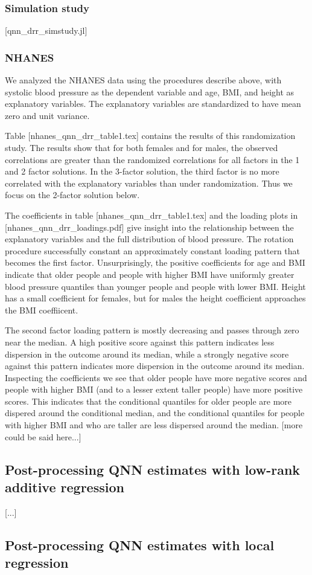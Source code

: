 \subsubsection{Simulation study}

[qnn_drr_simstudy.jl]

\subsubsection{NHANES}

We analyzed the NHANES data using the procedures describe above, with
systolic blood pressure as the dependent variable and age, BMI, and
height as explanatory variables.  The explanatory variables are
standardized to have mean zero and unit variance.

Table [nhanes_qnn_drr_table1.tex] contains the results of this
randomization study.  The results show that for both females and for
males, the observed correlations are greater than the randomized
correlations for all factors in the 1 and 2 factor solutions.  In the
3-factor solution, the third factor is no more correlated with the
explanatory variables than under randomization.  Thus we focus on the
2-factor solution below.

The coefficients in table [nhanes_qnn_drr_table1.tex] and the loading
plots in [nhanes_qnn_drr_loadings.pdf] give insight into the
relationship between the explanatory variables and the full
distribution of blood pressure. The rotation procedure successfully
constant an approximately constant loading pattern that becomes the
first factor.  Unsurprisingly, the positive coefficients for age and
BMI indicate that older people and people with higher BMI have
uniformly greater blood pressure quantiles than younger people and
people with lower BMI. Height has a small coefficient for females, but
for males the height coefficient approaches the BMI coeffiicent.

The second factor loading pattern is mostly decreasing and passes
through zero near the median.  A high positive score against this
pattern indicates less dispersion in the outcome around its median,
while a strongly negative score against this pattern indicates more
dispersion in the outcome around its median.  Inspecting the
coefficients we see that older people have more negative scores and
people with higher BMI (and to a lesser extent taller people) have
more positive scores.  This indicates that the conditional quantiles
for older people are more dispered around the conditional median, and
the conditional quantiles for people with higher BMI and who are
taller are less dispersed around the median.  [more could be said
here...]

\subsection{Post-processing QNN estimates with low-rank additive regression}

[...]

\subsection{Post-processing QNN estimates with local regression}
